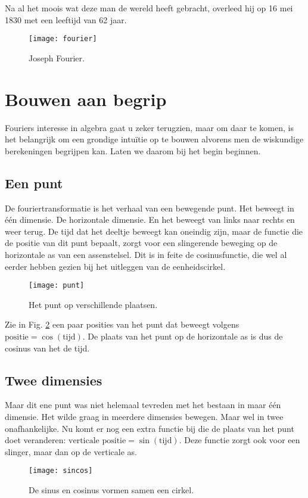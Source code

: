 \documentclass[11pt,fleqn]{book} %
\begin{document}
Na al het moois wat deze man de wereld heeft gebracht, overleed hij op 16 mei 1830 met een leeftijd van 62 jaar.
\begin{figure}[h]
	\centering\texttt{[image: fourier]}
	\caption{Joseph Fourier.}
	\label{fig:fourier}
\end{figure}

\section{Bouwen aan begrip}

Fouriers interesse in algebra gaat u zeker terugzien, maar om daar te komen, is het belangrijk om een grondige intuïtie op te bouwen alvorens men de wiskundige berekeningen begrijpen kan. Laten we daarom bij het begin beginnen.

\subsection{Een punt}
De fouriertransformatie is het verhaal van een bewegende punt. Het beweegt in één dimensie. De horizontale dimensie. En het beweegt van links naar rechts en weer terug. De tijd dat het deeltje beweegt kan oneindig zijn, maar de functie die de positie van dit punt bepaalt, zorgt voor een slingerende beweging op de horizontale as van een assenstelsel. Dit is in feite de cosinusfunctie, die wel al eerder hebben gezien bij het uitleggen van de eenheidscirkel.
\begin{figure}[h]
	\centering\texttt{[image: punt]}
	\caption{Het punt op verschillende plaatsen.}
	\label{fig:punt}
\end{figure}

Zie in Fig. \ref{fig:punt} een paar posities van het punt dat beweegt volgens $\text{positie}=\cos{(\text{tijd})}$. De plaats van het punt op de horizontale as is dus de cosinus van het de tijd.

\subsection{Twee dimensies}
Maar dit ene punt was niet helemaal tevreden met het bestaan in maar één dimensie. Het wilde graag in meerdere dimensies bewegen. Maar wel in twee onafhankelijke. Nu komt er nog een extra functie bij die de plaats van het punt doet veranderen: $\text{verticale positie}=\sin{(\text{tijd})}$. Deze functie zorgt ook voor een slinger, maar dan op de verticale as.
\begin{figure}[h]
	\centering\texttt{[image: sincos]}
	\caption{De sinus en cosinus vormen samen een cirkel.}
	\label{fig:sincos}
\end{figure}
\end{document}
